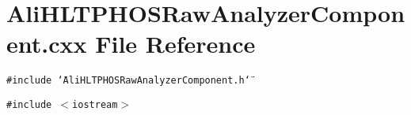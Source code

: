 \section{Ali\-HLTPHOSRaw\-Analyzer\-Component.cxx File Reference}
\label{AliHLTPHOSRawAnalyzerComponent_8cxx}
{\tt \#include \char`\"{}Ali\-HLTPHOSRaw\-Analyzer\-Component.h\char`\"{}}\par
{\tt \#include $<$iostream$>$}\par
